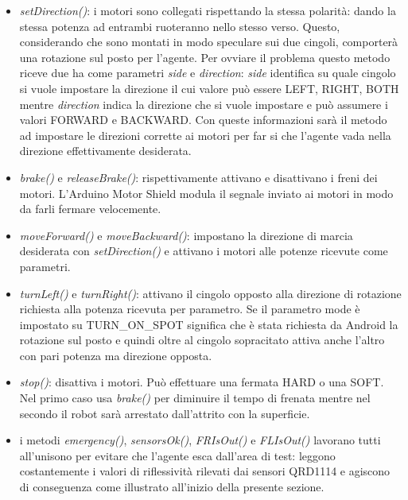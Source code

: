\begin{itemize}
\item \emph{setDirection()}: i motori sono collegati rispettando la stessa 
polarità: dando la stessa potenza ad entrambi ruoteranno nello stesso verso. 
Questo, considerando che sono montati in modo speculare sui due cingoli,
comporterà una rotazione sul posto per l'agente. Per ovviare 
il problema questo metodo riceve due ha come parametri \emph{side} e \emph{direction}: 
\emph{side} identifica su quale cingolo si vuole impostare la direzione il cui valore 
può essere LEFT, RIGHT, BOTH mentre \emph{direction} indica la direzione che si 
vuole impostare e può assumere i valori FORWARD e BACKWARD.
Con queste informazioni sarà il metodo ad impostare le direzioni corrette ai motori 
per far si che l'agente vada nella direzione effettivamente desiderata.
\item \emph{brake()} e \emph{releaseBrake()}: rispettivamente attivano e disattivano i 
freni dei motori. L'Arduino Motor Shield modula il segnale inviato ai motori in 
modo da farli fermare velocemente.
\item \emph{moveForward()} e \emph{moveBackward()}: impostano la direzione di marcia 
desiderata con \emph{setDirection()} e attivano i motori alle potenze ricevute come 
parametri.
\item \emph{turnLeft()} e \emph{turnRight()}: attivano il cingolo opposto alla 
direzione di rotazione richiesta alla potenza ricevuta per parametro. Se il  parametro
mode è impostato su TURN\_ON\_SPOT significa che è stata richiesta da Android la 
rotazione sul posto e quindi oltre al cingolo sopracitato attiva anche l'altro 
con pari potenza ma direzione opposta.
\item \emph{stop()}: disattiva i motori. Può effettuare una fermata HARD o una SOFT.
Nel primo caso usa \emph{brake()} per diminuire il tempo di frenata mentre nel 
secondo il robot sarà arrestato dall'attrito con la superficie.
\item i metodi \emph{emergency()}, \emph{sensorsOk()}, \emph{FRIsOut()} e \emph{FLIsOut()}
lavorano tutti all'unisono per evitare che l'agente esca dall'area di test: leggono costantemente 
i valori di riflessività rilevati dai sensori QRD1114 e agiscono di conseguenza come 
illustrato all'inizio della presente sezione. 
\end{itemize}